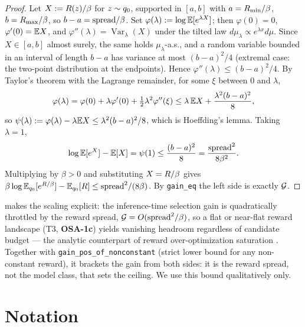 \begin{proof}
Let $X:=R(z)/\beta$ for $z\sim q_{0}$, supported in $[a,b]$ with $a=R_{\min}/\beta$,
$b=R_{\max}/\beta$, so $b-a=\mathrm{spread}/\beta$. Set $\varphi(\lambda):=\log\mathbb{E}[e^{\lambda X}]$; then
$\varphi(0)=0$, $\varphi'(0)=\mathbb{E} X$, and $\varphi''(\lambda)=\operatorname{Var}_{\lambda}(X)$ under
the tilted law $d\mu_\lambda\propto e^{\lambda x}d\mu$. Since $X\in[a,b]$ almost surely, the same
holds $\mu_\lambda$-a.s., and a random variable bounded in an interval of length $b-a$ has variance at
most $(b-a)^2/4$ (extremal case: the two-point distribution at the endpoints). Hence
$\varphi''(\lambda)\le (b-a)^2/4$. By Taylor's theorem with the Lagrange remainder, for some $\xi$
between $0$ and $\lambda$,
\[
\varphi(\lambda)=\varphi(0)+\lambda\varphi'(0)+\tfrac12\lambda^2\varphi''(\xi)\le \lambda\,\mathbb{E} X+\frac{\lambda^2 (b-a)^2}{8},
\]
so $\psi(\lambda):=\varphi(\lambda)-\lambda\mathbb{E} X\le \lambda^2(b-a)^2/8$, which is Hoeffding's lemma.
Taking $\lambda=1$,
\[
\log\mathbb{E}[e^{X}]-\mathbb{E}[X]=\psi(1)\le \frac{(b-a)^2}{8}=\frac{\mathrm{spread}^2}{8\beta^2}.
\]
Multiplying by $\beta>0$ and substituting $X=R/\beta$ gives
$\beta\log\mathbb{E}_{q_{0}}[e^{R/\beta}]-\mathbb{E}_{q_{0}}[R]\le \mathrm{spread}^2/(8\beta)$. By \texttt{gain\_eq} the
left side is exactly $\mathcal{G}$.
\end{proof}

 makes the scaling explicit: the inference-time selection gain is quadratically
throttled by the reward spread, $\mathcal{G}=O(\mathrm{spread}^2/\beta)$, so a flat or near-flat reward landscape
(T3, \textbf{OSA-1c}) yields vanishing headroom regardless of candidate budget --- the analytic
counterpart of reward over-optimization saturation \citep{gao2023overopt}. Together with
\texttt{gain\_pos\_of\_nonconstant} (strict lower bound for any non-constant reward), it brackets the
gain from both sides: it is the reward spread, not the model class, that sets the ceiling. We use this
bound qualitatively only.

\section{Notation}
\label{app:notation}


